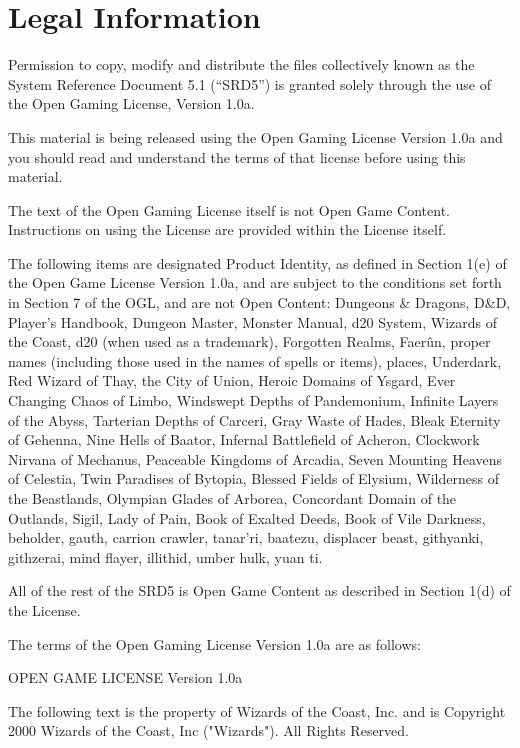 \hypertarget{legal-information}{%
\section{Legal Information}\label{legal-information}}

Permission to copy, modify and distribute the files collectively known
as the System Reference Document 5.1 (``SRD5'') is granted solely
through the use of the Open Gaming License, Version 1.0a.

This material is being released using the Open Gaming License Version
1.0a and you should read and understand the terms of that license before
using this material.

The text of the Open Gaming License itself is not Open Game Content.
Instructions on using the License are provided within the License
itself.

The following items are designated Product Identity, as defined in
Section 1(e) of the Open Game License Version 1.0a, and are subject to
the conditions set forth in Section 7 of the OGL, and are not Open
Content: Dungeons \& Dragons, D\&D, Player's Handbook, Dungeon Master,
Monster Manual, d20 System, Wizards of the Coast, d20 (when used as a
trademark), Forgotten Realms, Faerûn, proper names (including those used
in the names of spells or items), places, Underdark, Red Wizard of Thay,
the City of Union, Heroic Domains of Ysgard, Ever Changing Chaos of
Limbo, Windswept Depths of Pandemonium, Infinite Layers of the Abyss,
Tarterian Depths of Carceri, Gray Waste of Hades, Bleak Eternity of
Gehenna, Nine Hells of Baator, Infernal Battlefield of Acheron,
Clockwork Nirvana of Mechanus, Peaceable Kingdoms of Arcadia, Seven
Mounting Heavens of Celestia, Twin Paradises of Bytopia, Blessed Fields
of Elysium, Wilderness of the Beastlands, Olympian Glades of Arborea,
Concordant Domain of the Outlands, Sigil, Lady of Pain, Book of Exalted
Deeds, Book of Vile Darkness, beholder, gauth, carrion crawler,
tanar'ri, baatezu, displacer beast, githyanki, githzerai, mind flayer,
illithid, umber hulk, yuan ti.

All of the rest of the SRD5 is Open Game Content as described in Section
1(d) of the License.

The terms of the Open Gaming License Version 1.0a are as follows:

OPEN GAME LICENSE Version 1.0a

The following text is the property of Wizards of the Coast, Inc. and is
Copyright 2000 Wizards of the Coast, Inc ("Wizards"). All Rights
Reserved.

